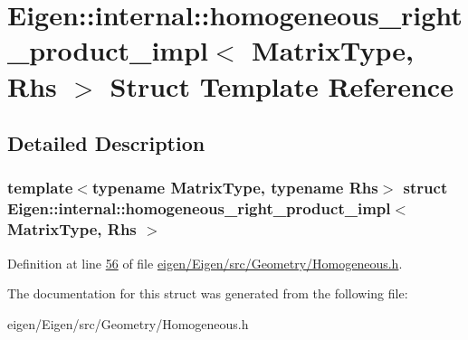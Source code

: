 \hypertarget{struct_eigen_1_1internal_1_1homogeneous__right__product__impl}{}\section{Eigen\+:\+:internal\+:\+:homogeneous\+\_\+right\+\_\+product\+\_\+impl$<$ Matrix\+Type, Rhs $>$ Struct Template Reference}
\label{struct_eigen_1_1internal_1_1homogeneous__right__product__impl}


\subsection{Detailed Description}
\subsubsection*{template$<$typename Matrix\+Type, typename Rhs$>$\newline
struct Eigen\+::internal\+::homogeneous\+\_\+right\+\_\+product\+\_\+impl$<$ Matrix\+Type, Rhs $>$}



Definition at line \hyperlink{eigen_2_eigen_2src_2_geometry_2_homogeneous_8h_source_l00056}{56} of file \hyperlink{eigen_2_eigen_2src_2_geometry_2_homogeneous_8h_source}{eigen/\+Eigen/src/\+Geometry/\+Homogeneous.\+h}.



The documentation for this struct was generated from the following file\+:\begin{DoxyCompactItemize}
\item 
eigen/\+Eigen/src/\+Geometry/\+Homogeneous.\+h\end{DoxyCompactItemize}
